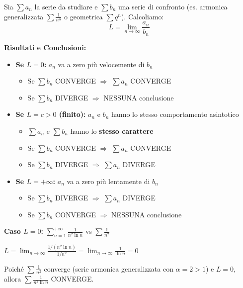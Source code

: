 \begin{enumerate}
\begin{strategia}
    Sia $\sum a_n$ la serie da studiare e $\sum b_n$ una serie di confronto (es. armonica generalizzata $\sum \frac{1}{n^\alpha}$ o geometrica $\sum q^n$). Calcoliamo:
    \[ L = \lim_{n \to \infty} \frac{a_n}{b_n} \]
    
    \textbf{Risultati e Conclusioni:}
    \begin{itemize}
        \item \textbf{Se $L = 0$:} $a_n$ va a zero più velocemente di $b_n$
        \begin{itemize}
            \item Se $\sum b_n$ CONVERGE $\Rightarrow$ $\sum a_n$ CONVERGE
            \item Se $\sum b_n$ DIVERGE $\Rightarrow$ NESSUNA conclusione
        \end{itemize}
        
        \item \textbf{Se $L = c > 0$ (finito):} $a_n$ e $b_n$ hanno lo stesso comportamento asintotico
        \begin{itemize}
            \item $\sum a_n$ e $\sum b_n$ hanno lo \textbf{stesso carattere}
            \item Se $\sum b_n$ CONVERGE $\Rightarrow$ $\sum a_n$ CONVERGE
            \item Se $\sum b_n$ DIVERGE $\Rightarrow$ $\sum a_n$ DIVERGE
        \end{itemize}
        
        \item \textbf{Se $L = +\infty$:} $a_n$ va a zero più lentamente di $b_n$
        \begin{itemize}
            \item Se $\sum b_n$ DIVERGE $\Rightarrow$ $\sum a_n$ DIVERGE
            \item Se $\sum b_n$ CONVERGE $\Rightarrow$ NESSUNA conclusione
        \end{itemize}
    \end{itemize}
    \end{strategia}

    \begin{esempio}
    \textbf{Caso $L = 0$:} $\sum_{n=1}^{+\infty} \frac{1}{n^2 \ln n}$ vs $\sum \frac{1}{n^2}$
    
    $L = \lim_{n \to \infty} \frac{1/(n^2 \ln n)}{1/n^2} = \lim_{n \to \infty} \frac{1}{\ln n} = 0$
    
    Poiché $\sum \frac{1}{n^2}$ converge (serie armonica generalizzata con $\alpha = 2 > 1$) e $L = 0$, allora $\sum \frac{1}{n^2 \ln n}$ CONVERGE.
    \end{esempio}


\end{enumerate}
